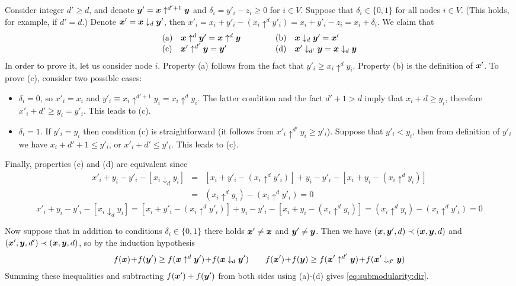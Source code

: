 \documentclass[11pt,onecolumn]{article}
\newcommand{\bx}{\mbox{\boldmath $x$}}
\newcommand{\by}{\mbox{\boldmath $y$}}
\begin{document}
Consider integer $d'\ge d$, and denote $\by'=\bx\uparrow^{d'+1}\by$ and $\delta_i=y'_i-z_i\ge 0$ for $i\in V$.
Suppose that $\delta_i \in \{0,1\}$ for all nodes $i\in V$. (This holds, for example, if $d'=d$.)
Denote $\bx'=\bx \downarrow_d \by'$, then $x'_i=x_i+y'_i- (x_i \uparrow^d y'_i)=x_i+y'_i-z_i=x_i+\delta_i$.
We claim that
\begin{equation}
\begin{tabular}{ll}
(a)$\quad \bx \uparrow^d \by' = \bx \uparrow^d \by \qquad \quad  $ &
(b)$\quad \bx \downarrow_d \by' = \bx' $ \\
(c)$\quad \bx' \uparrow^{d'} \by =  \by' $ &
(d)$\quad \bx' \downarrow_{d'} \by = \bx \downarrow_d \by$
\end{tabular}
\label{eq:dir:proof}
\end{equation}
In order to prove it, let us consider node $i$. Property (a) follows from the fact that $y'_i \ge x_i\uparrow^d y_i$.
Property (b) is the definition of $\bx'$. To prove (c), consider two possible cases:
\begin{itemize}
\item $\delta_i=0$, so $x'_i=x_i$ and $y'_i \equiv x_i \uparrow^{d'+1} y_i = x_i\uparrow^d y_i$. The latter condition and the fact
$d'+1>d$ imply that $x_i+d\ge y_i$, therefore $x'_i+d' \ge y_i = y'_i$. This leads to (c).
\item $\delta_i=1$. If $y'_i=y_i$ then condition (c) is straightforward (it follows from $x'_i\uparrow^{d'} y_i\ge y'_i$). 
Suppose that $y'_i < y_i$, then from definition of $y'_i$ we have $x_i+d'+1\le y'_i$, or $x'_i+d'\le y'_i$. This leads to (c).
\end{itemize}
Finally, properties (c) and (d) are equivalent since
\ifICALP
\begin{eqnarray*}
x'_i + y_i - y'_i - [x_i \downarrow_d y_i] 
& = & [x_i + y'_i - (x_i\uparrow^d y'_i)] + y_i - y'_i - [x_i + y_i - (x_i \uparrow^d y_i)] \\
& = & (x_i\uparrow^d y_i) - (x_i\uparrow^d y'_i)
= 0
\end{eqnarray*}
\else
$$
x'_i + y_i - y'_i - [x_i \downarrow_d y_i] 
= [x_i + y'_i - (x_i\uparrow^d y'_i)] + y_i - y'_i - [x_i + y_i - (x_i \uparrow^d y_i)] 
= (x_i\uparrow^d y_i) - (x_i\uparrow^d y'_i)
= 0
$$
\fi

Now suppose that in addition to conditions $\delta_i\in\{0,1\}$ there holds $\bx'\ne \bx$ and $\by'\ne \by$. 
Then we have $(\bx,\by',d)\prec (\bx,\by,d)$ and $(\bx',\by,d')\prec (\bx,\by,d)$, so by the induction hypothesis
\begin{eqnarray*}
f(\bx)\!+\!f(\by') \ge  f(\bx \uparrow^d \by')\!+\!f(\bx \downarrow_d \by') & \quad &
f(\bx')\!+\!f(\by) \ge  f(\bx' \uparrow^{d'} \by)\!+\!f(\bx' \downarrow_{d'} \by)
\end{eqnarray*}
Summing these inequalities and subtracting $f(\bx')+f(\by')$ from both sides using (a)-(d) gives \eqref{eq:submodularity:dir}.
\end{document}
